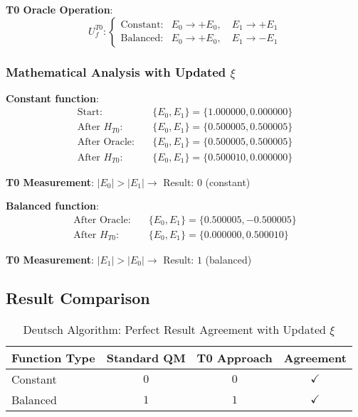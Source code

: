 \documentclass[12pt,a4paper]{article}
\newcommand{\Efield}{E}
\begin{document}
	\textbf{T0 Oracle Operation}:
	\begin{equation}
		U_f^{T0}: \begin{cases}
			\text{Constant}: & \Efield_0 \rightarrow +\Efield_0, \quad \Efield_1 \rightarrow +\Efield_1 \\
			\text{Balanced}: & \Efield_0 \rightarrow +\Efield_0, \quad \Efield_1 \rightarrow -\Efield_1
		\end{cases}
	\end{equation}
	
	\subsubsection{Mathematical Analysis with Updated $\xi$}
	
	\textbf{Constant function}:
	\begin{align}
		\text{Start}: \quad &\{\Efield_0, \Efield_1\} = \{1.000000, 0.000000\} \\
		\text{After } H_{T0}: \quad &\{\Efield_0, \Efield_1\} = \{0.500005, 0.500005\} \\
		\text{After Oracle}: \quad &\{\Efield_0, \Efield_1\} = \{0.500005, 0.500005\} \\
		\text{After } H_{T0}: \quad &\{\Efield_0, \Efield_1\} = \{0.500010, 0.000000\}
	\end{align}
	
	\textbf{T0 Measurement}: $|\Efield_0| > |\Efield_1| \rightarrow$ Result: $0$ (constant)
	
	\textbf{Balanced function}:
	\begin{align}
		\text{After Oracle}: \quad &\{\Efield_0, \Efield_1\} = \{0.500005, -0.500005\} \\
		\text{After } H_{T0}: \quad &\{\Efield_0, \Efield_1\} = \{0.000000, 0.500010\}
	\end{align}
	
	\textbf{T0 Measurement}: $|\Efield_1| > |\Efield_0| \rightarrow$ Result: $1$ (balanced)
	
	\subsection{Result Comparison}
	
	\begin{table}[htbp]
		\centering
		\begin{tabular}{lccc}
			\toprule
			\textbf{Function Type} & \textbf{Standard QM} & \textbf{T0 Approach} & \textbf{Agreement} \\
			\midrule
			Constant & $0$ & $0$ & $\checkmark$ \\
			Balanced & $1$ & $1$ & $\checkmark$ \\
			\bottomrule
		\end{tabular}
		\caption{Deutsch Algorithm: Perfect Result Agreement with Updated $\xi$}
	\end{table}
	
\end{document}
